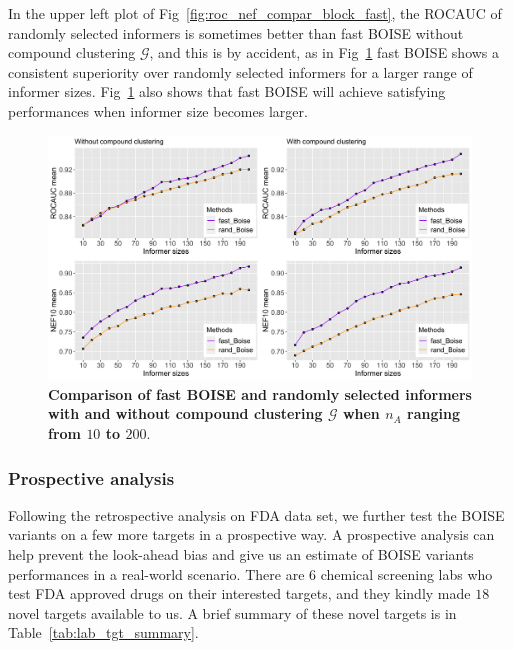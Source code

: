 \documentclass[11pt,a4paper]{article}
\theoremstyle{plain}
\begin{document}
In the upper left plot of Fig~\ref{fig:roc_nef_compar_block_fast}, the ROCAUC of randomly selected informers is sometimes better than fast BOISE without compound clustering $\mathcal G$, and this is by accident, as in Fig~\ref{fig:fast_rand_200_informer} fast BOISE shows a consistent superiority over randomly selected informers for a larger range of informer sizes.
Fig~\ref{fig:fast_rand_200_informer} also shows that fast BOISE will achieve satisfying performances when informer size becomes larger. 


\begin{figure}[!ht]
\centering
\includegraphics[width=5.0in]{Figs/fast_entropy_pel1_rand_200_informers.png}
\caption{\label{fig:fast_rand_200_informer} 
{\bf Comparison of fast BOISE and randomly selected informers with and without compound clustering $\mathcal G$ when $n_A$ ranging from $10$ to $200$}.}
\end{figure}



\subsubsection{Prospective analysis}
Following the retrospective analysis on FDA data set, we further test the BOISE variants on a few more targets in a prospective way. A prospective analysis can help prevent the look-ahead bias and give us an estimate of BOISE variants performances in a real-world scenario. There are $6$ chemical screening labs who test FDA approved drugs on their interested targets, and they kindly made $18$ novel targets available to us. A brief summary of these novel targets is in Table~\ref{tab:lab_tgt_summary}. 
\end{document}
